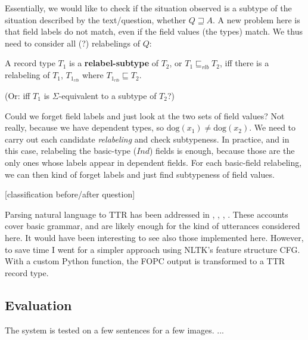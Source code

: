 Essentially, we would like to check if the situation observed is a subtype of the situation described by the text/question, whether $Q \sqsupseteq A$. A new problem here is that field labels do not match, even if the field values (the types) match. We thus need to consider all (?) relabelings of $Q$:

A record type $T_1$ is a \textbf{relabel-subtype} of $T_2$, or $T_1 \sqsubseteq_{rlb} T_2$,  iff there is a relabeling of $T_1$, $T_{1_{rlb}}$ where $T_{1_{rlb}} \sqsubseteq T_2$.

(Or: iff $T_1$ is $\Sigma$-equivalent to a subtype of $T_2$?)

Could we forget field labels and just look at the two sets of field values? Not really, because we have dependent types, so $\text{dog}(x_1) ≠ \text{dog}(x_2)$. We need to carry out each candidate \textit{relabeling} and check subtypeness. In practice, and in this case, relabeling the basic-type ($Ind$) fields is enough, because those are the only ones whose labels appear in dependent fields. For each basic-field relabeling, we can then kind of forget labels and just find subtypeness of field values.

[classification before/after question]

Parsing natural language to TTR has been addressed in \cite{CooperRecordsRecordTypes2005}, \cite{RobinCooperAustiniantruthattitudes2005}, \cite{CooperTypetheorysemantics2012}, \cite{CooperTypetheorylanguage2016}.
These accounts cover basic grammar, and are likely enough for the kind of utterances considered here.
It would have been interesting to see also those implemented here.
However, to save time I went for a simpler approach using NLTK's feature structure CFG.
With a custom Python function, the FOPC output is transformed to a TTR record type.



\subsection{Evaluation}

The system is tested on a few sentences for a few images.
...
